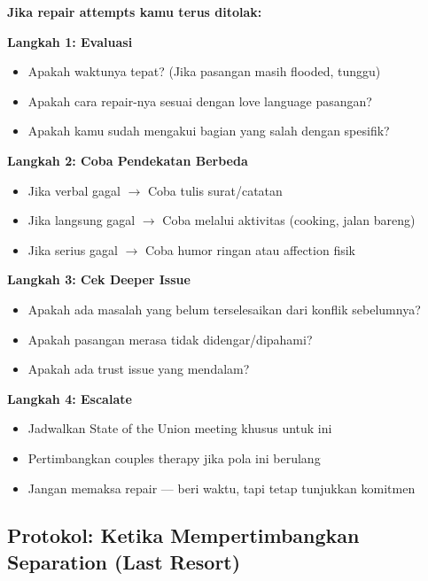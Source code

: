 \begin{warningbox}
\textbf{Jika repair attempts kamu terus ditolak:}

\vspace{0.2cm}
\textbf{Langkah 1: Evaluasi}
\begin{itemize}[itemsep=0.1cm]
    \item[$\square$] Apakah waktunya tepat? (Jika pasangan masih flooded, tunggu)
    \item[$\square$] Apakah cara repair-nya sesuai dengan love language pasangan?
    \item[$\square$] Apakah kamu sudah mengakui bagian yang salah dengan spesifik?
\end{itemize}

\textbf{Langkah 2: Coba Pendekatan Berbeda}
\begin{itemize}[itemsep=0.1cm]
    \item[$\square$] Jika verbal gagal $\rightarrow$ Coba tulis surat/catatan
    \item[$\square$] Jika langsung gagal $\rightarrow$ Coba melalui aktivitas (cooking, jalan bareng)
    \item[$\square$] Jika serius gagal $\rightarrow$ Coba humor ringan atau affection fisik
\end{itemize}

\textbf{Langkah 3: Cek Deeper Issue}
\begin{itemize}[itemsep=0.1cm]
    \item[$\square$] Apakah ada masalah yang belum terselesaikan dari konflik sebelumnya?
    \item[$\square$] Apakah pasangan merasa tidak didengar/dipahami?
    \item[$\square$] Apakah ada trust issue yang mendalam?
\end{itemize}

\textbf{Langkah 4: Escalate}
\begin{itemize}[itemsep=0.1cm]
    \item[$\square$] Jadwalkan State of the Union meeting khusus untuk ini
    \item[$\square$] Pertimbangkan couples therapy jika pola ini berulang
    \item[$\square$] Jangan memaksa repair --- beri waktu, tapi tetap tunjukkan komitmen
\end{itemize}
\end{warningbox}

\subsection{Protokol: Ketika Mempertimbangkan Separation (Last Resort)}


